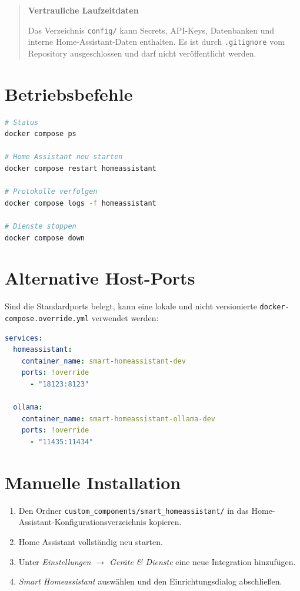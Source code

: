 \documentclass[
  11pt,
  a4paper,
  oneside,
  parskip=half
]{scrreprt}
\newcommand{\code}[1]{\texttt{#1}}
\newenvironment{smartwarning}[1]
{%
  \begin{quote}
    \color{SmartDark}
    \textbf{\textcolor{SmartAmber!80!black}{#1}}\par\smallskip
}
{%
  \end{quote}
}
\begin{document}
\begin{smartwarning}{Vertrauliche Laufzeitdaten}
Das Verzeichnis \code{config/} kann Secrets, API-Keys, Datenbanken und interne
Home-Assistant-Daten enthalten. Es ist durch \code{.gitignore} vom Repository
ausgeschlossen und darf nicht veröffentlicht werden.
\end{smartwarning}

\section{Betriebsbefehle}

\begin{lstlisting}[language=bash,caption={Häufige Docker-Compose-Befehle}]
# Status
docker compose ps

# Home Assistant neu starten
docker compose restart homeassistant

# Protokolle verfolgen
docker compose logs -f homeassistant

# Dienste stoppen
docker compose down
\end{lstlisting}

\section{Alternative Host-Ports}

Sind die Standardports belegt, kann eine lokale und nicht versionierte
\code{docker-compose.override.yml} verwendet werden:

\begin{lstlisting}[language=yaml,caption={Beispiel für alternative Host-Ports}]
services:
  homeassistant:
    container_name: smart-homeassistant-dev
    ports: !override
      - "18123:8123"

  ollama:
    container_name: smart-homeassistant-ollama-dev
    ports: !override
      - "11435:11434"
\end{lstlisting}

\section{Manuelle Installation}

\begin{enumerate}
  \item Den Ordner \code{custom\_components/smart\_homeassistant/} in das
        Home-Assistant-Konfigurationsverzeichnis kopieren.
  \item Home Assistant vollständig neu starten.
  \item Unter \emph{Einstellungen $\rightarrow$ Geräte \& Dienste} eine neue Integration
        hinzufügen.
  \item \emph{Smart Homeassistant} auswählen und den Einrichtungsdialog abschließen.
\end{enumerate}
\end{document}
